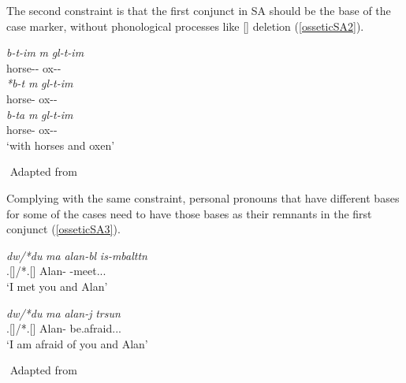The second constraint is that the first conjunct in SA should be the base of the case marker, without phonological processes like [\textturna] deletion (\ref{osseticSA2}).

\begin{exe}
    \ex \label{osseticSA2}
    \begin{xlist}
    \ex 
    \gll 
    \textit{b\textturna\textchi-t-im\textturna} \textit{\textturna m\textturna\footnotemark} \textit{g\textturna l-t-im\textturna} \\ horse-{\Pl}-{\Com} {\And} ox-{\Pl}-{\Com} \\
    
    \ex 
    \gll 
    \textit{*b\textturna\textchi-t} \textit{\textturna m\textturna} \textit{g\textturna l-t-im\textturna} \\ horse-{\Pl} {\And} ox-{\Pl}-{\Com} \\
    
    \ex 
    \gll 
    \textit{b\textturna\textchi-ta} \textit{\textturna m\textturna} \textit{g\textturna l-t-im\textturna} \\ horse-{\Pl} {\And} ox-{\Pl}-{\Com} \\
    \glt `with horses and oxen'
    \end{xlist}
    ${}$ \hfill Adapted from \cite{erschler2012suspended}
\end{exe}


Complying with the same constraint, personal pronouns that have different bases for some of the cases need to have those bases as their remnants in the first conjunct (\ref{osseticSA3}).

\begin{exe}
    \ex \label{osseticSA3}
    \begin{xlist}
        \ex \gll 
        \textit{d\textturna w/*du} \textit{\textturna ma} \textit{alan-b\textturna l} \textit{is-\textturna mbaltt\textturna n} \\ {\Second}.{\Sg}[{\Obl}]/*{\Second}.{\Sg}[{\Nom}] {\And} Alan-{\Sup} {\Prv}-meet.{\Pst}.{\First}.{\Sg} \\
        \glt `I met you and Alan'
        
        \ex \gll 
        \textit{d\textturna w/*du} \textit{\textturna ma} \textit{alan-\textturna j} \textit{t\textturna rsun} \\ {\Second}.{\Sg}[{\Obl}]/*{\Second}.{\Sg}[{\Nom}] {\And} Alan-{\Abl} be.afraid.{\Prs}.{\First}.{\Sg} \\
        \glt `I am afraid of you and Alan'
    \end{xlist}
    ${}$ \hfill Adapted from \cite{erschler2012suspended}
\end{exe}

